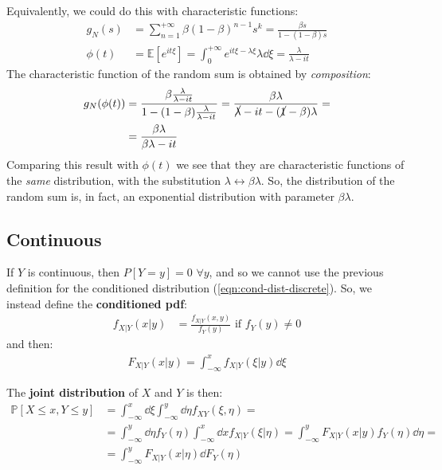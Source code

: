 \documentclass[../template.tex]{subfiles}
\begin{document}
\begin{example}
    \medskip

    Equivalently, we could do this with characteristic functions: %
    \begin{align*}
        g_N(s) &= \sum_{n=1}^{+\infty} \beta (1-\beta)^{n-1} s^k = \frac{\beta s}{1 - (1-\beta)s}\\
        \phi(t) &= \mathbb{E}[e^{it \xi}] = \int_{0}^{+\infty} e^{it \xi - \lambda \xi} \lambda \dd{\xi} = \frac{\lambda}{\lambda - it} 
    \end{align*}
    The characteristic function of the random sum is obtained by \textit{composition}:
    \begin{align*}
        g_N(\phi(t)) &= \frac{\beta \frac{\lambda}{\lambda -it} }{1 - (1-\beta) \frac{\lambda}{\lambda - it} }  = \frac{\beta \lambda}{\cancel{\lambda} -it - (\cancel{1}-\beta)\lambda} =\\
        &= \frac{\beta \lambda}{\beta \lambda - it} 
    \end{align*} 
    Comparing this result with $\phi(t)$ we see that they are characteristic functions of the \textit{same} distribution, with the substitution $\lambda \leftrightarrow \beta \lambda$. So, the distribution of the random sum is, in fact, an exponential distribution with parameter $\beta \lambda$.
\end{example}

\subsection{Continuous}
If $Y$ is continuous, then $P[Y=y] = 0$ $\forall y$, and so we cannot use the previous definition for the conditioned distribution (\ref{eqn:cond-dist-discrete}). So, we instead define the \textbf{conditioned pdf}:
\begin{align}\label{eqn:continuous-conditioned}
    f_{X|Y}(x|y) &= \frac{f_{X|Y}(x,y)}{f_Y(y)} \text{ if } f_Y(y) \neq 0
\end{align} 
and then:
\begin{align*}
    F_{X|Y}(x|y) = \int_{-\infty}^x f_{X|Y} (\xi|y) \dd{\xi}
\end{align*}

The \textbf{joint distribution} of $X$ and $Y$ is then:
\begin{align*}
    \mathbb{P}[X \leq x, Y \leq y] &= \int_{-\infty}^x \dd{\xi} \int_{-\infty}^y \dd{\eta} f_{XY}(\xi, \eta) = \\
    &= \int_{-\infty}^y \dd{\eta} f_Y(\eta) \int_{-\infty}^x \dd{x} f_{X|Y}(\xi | \eta) = \int_{-\infty}^y F_{X|Y} (x|y) f_{Y}(\eta)\dd{\eta} =\\
    &= \int_{-\infty}^y F_{X|Y}(x|\eta) \dd{F_Y(\eta)}
\end{align*}  
\end{document}
